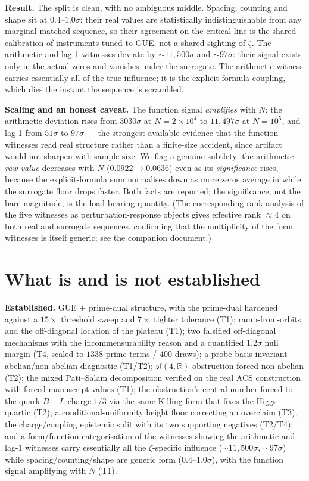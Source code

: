 \documentclass[11pt]{article}
\newcommand{\sltwo}{\mathfrak{sl}(4,\mathbb{R})}
\begin{document}
\textbf{Result.} The split is clean, with no ambiguous middle. Spacing, counting and shape sit at $0.4$--$1.0\sigma$: their real values are statistically indistinguishable from any marginal-matched sequence, so their agreement on the critical line is the shared calibration of instruments tuned to GUE, not a shared sighting of $\zeta$. The arithmetic and lag-1 witnesses deviate by $\sim\!11{,}500\sigma$ and $\sim\!97\sigma$: their signal exists only in the actual zeros and vanishes under the surrogate. The arithmetic witness carries essentially all of the true influence; it is the explicit-formula coupling, which dies the instant the sequence is scrambled.

\textbf{Scaling and an honest caveat.} The function signal \emph{amplifies} with $N$: the arithmetic deviation rises from $3030\sigma$ at $N=2\times10^4$ to $11{,}497\sigma$ at $N=10^5$, and lag-1 from $51\sigma$ to $97\sigma$ --- the strongest available evidence that the function witnesses read real structure rather than a finite-size accident, since artifact would not sharpen with sample size. We flag a genuine subtlety: the arithmetic \emph{raw value} decreases with $N$ ($0.0922\to0.0636$) even as its \emph{significance} rises, because the explicit-formula sum normalises down as more zeros average in while the surrogate floor drops faster. Both facts are reported; the significance, not the bare magnitude, is the load-bearing quantity. (The corresponding rank analysis of the five witnesses as perturbation-response objects gives effective rank $\approx4$ on both real and surrogate sequences, confirming that the multiplicity of the form witnesses is itself generic; see the companion document.)

\section{What is and is not established}

\textbf{Established.} GUE $+$ prime-dual structure, with the prime-dual hardened against a $15\times$ threshold sweep and $7\times$ tighter tolerance (T1); ramp-from-orbits and the off-diagonal location of the plateau (T1); two falsified off-diagonal mechanisms with the incommensurability reason and a quantified $1.2\sigma$ null margin (T4, scaled to $1338$ prime terms / $400$ draws); a probe-basis-invariant abelian/non-abelian diagnostic (T1/T2); $\sltwo$ obstruction forced non-abelian (T2); the mixed Pati--Salam decomposition verified on the real ACS construction with forced manuscript values (T1); the obstruction's central number forced to the quark $B\!-\!L$ charge $1/3$ via the same Killing form that fixes the Higgs quartic (T2); a conditional-uniformity height floor correcting an overclaim (T3); the charge/coupling epistemic split with its two supporting negatives (T2/T4); and a form/function categorisation of the witnesses showing the arithmetic and lag-1 witnesses carry essentially all the $\zeta$-specific influence ($\sim\!11{,}500\sigma$, $\sim\!97\sigma$) while spacing/counting/shape are generic form ($0.4$--$1.0\sigma$), with the function signal amplifying with $N$ (T1).
\end{document}
